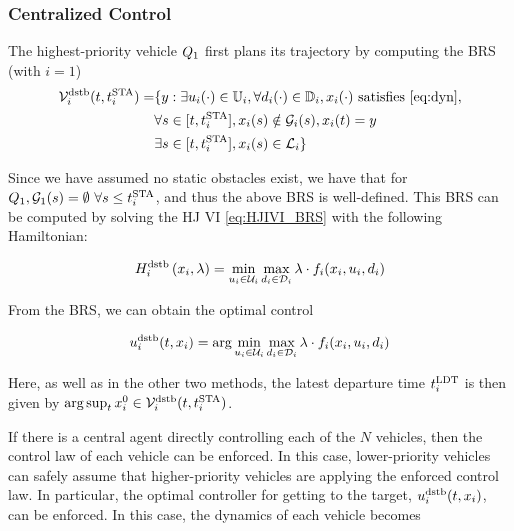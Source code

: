 \subsubsection{Centralized Control\label{sec:cc}}
The highest-priority vehicle $Q_1$ first plans its trajectory by computing the BRS (with $i=1$)
\begin{equation}
\label{eq:BRS}
\begin{aligned}
\brs_i^\text{dstb}(t, \sta_i) = & \{y: \exists \ctrl_i(\cdot) \in \cfset_i, \forall \dstb_i(\cdot) \in \dfset_i, \state_i(\cdot) \text{ satisfies \eqref{eq:dyn}},\\
& \forall s \in [t, \sta_i], \state_i(s) \notin \obsset_i(s), \state_i(t) = y\\
& \exists s \in [t, \sta_i], \state_i(s) \in \targetset_i\}
\end{aligned}
\end{equation}

Since we have assumed no static obstacles exist, we have that for $Q_1, \mathcal{G}_1(s)=\emptyset ~ \forall s \le t^\text{STA}_i$, and thus the above BRS is well-defined. This BRS can be computed by solving the HJ VI \eqref{eq:HJIVI_BRS} with the following Hamiltonian:

\begin{equation}
H_i^\text{dstb}\left(x_i, \lambda\right) = \min_{u_i \in \mathcal{U}_i} \max_{d_i \in \mathcal{D}_i} \lambda \cdot f_i(x_i, u_i, d_i)
\end{equation}

From the BRS, we can obtain the optimal control

\begin{equation}
\label{eq:opt_ctrl_i}
\ctrl_i^\text{dstb}(t,\state_i) =  \arg \min_{\ctrl_i \in \cset_i} \max_{\dstb_i \in \dset_i} \costate \cdot \fdyn_i(\state_i, \ctrl_i, \dstb_i)
\end{equation}

Here, as well as in the other two methods, the latest departure time $t^\text{LDT}_i$ is then given by $\arg \sup_t x_{i}^0 \in \mathcal{V}_i^\text{dstb}(t, t^\text{STA}_i)$.

If there is a central agent directly controlling each of the $N$ vehicles, then the control law of each vehicle can be enforced. In this case, lower-priority vehicles can safely assume that higher-priority vehicles are applying the enforced control law. In particular, the optimal controller for getting to the target, $u^\text{dstb}_i(t, x_i)$, can be enforced. In this case, the dynamics of each vehicle becomes 

